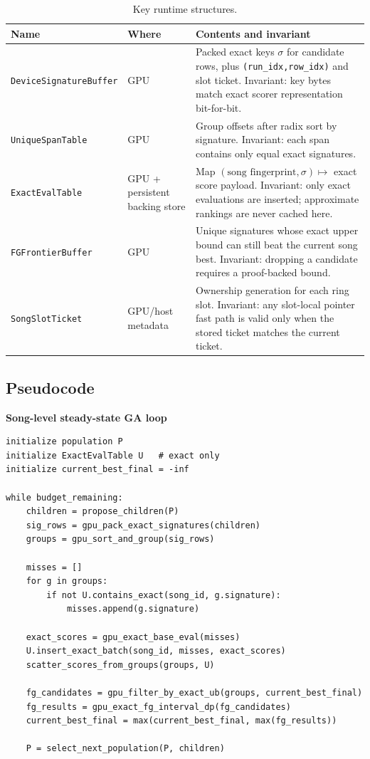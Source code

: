 \documentclass[11pt]{article}
\begin{document}
\begin{table}[H]
\centering
\caption{Key runtime structures.}
\label{tab:datastructures}
\small
\begin{tabularx}{\textwidth}{>{\raggedright\arraybackslash}p{}>{\raggedright\arraybackslash}p{}X}
\toprule
\textbf{Name} & \textbf{Where} & \textbf{Contents and invariant} \\
\midrule
\texttt{DeviceSignatureBuffer} & GPU & Packed exact keys $\sigma$ for candidate rows, plus \texttt{(run\_idx,row\_idx)} and slot ticket. Invariant: key bytes match exact scorer representation bit-for-bit. \\
\midrule
\texttt{UniqueSpanTable} & GPU & Group offsets after radix sort by signature. Invariant: each span contains only equal exact signatures. \\
\midrule
\texttt{ExactEvalTable} & GPU + persistent backing store & Map $(\text{song fingerprint},\sigma) \mapsto$ exact score payload. Invariant: only exact evaluations are inserted; approximate rankings are never cached here. \\
\midrule
\texttt{FGFrontierBuffer} & GPU & Unique signatures whose exact upper bound can still beat the current song best. Invariant: dropping a candidate requires a proof-backed bound. \\
\midrule
\texttt{SongSlotTicket} & GPU/host metadata & Ownership generation for each ring slot. Invariant: any slot-local pointer fast path is valid only when the stored ticket matches the current ticket. \\
\bottomrule
\end{tabularx}
\end{table}

\subsection{Pseudocode}

\textbf{Song-level steady-state GA loop}

\begin{lstlisting}
initialize population P
initialize ExactEvalTable U   # exact only
initialize current_best_final = -inf

while budget_remaining:
    children = propose_children(P)
    sig_rows = gpu_pack_exact_signatures(children)
    groups = gpu_sort_and_group(sig_rows)

    misses = []
    for g in groups:
        if not U.contains_exact(song_id, g.signature):
            misses.append(g.signature)

    exact_scores = gpu_exact_base_eval(misses)
    U.insert_exact_batch(song_id, misses, exact_scores)
    scatter_scores_from_groups(groups, U)

    fg_candidates = gpu_filter_by_exact_ub(groups, current_best_final)
    fg_results = gpu_exact_fg_interval_dp(fg_candidates)
    current_best_final = max(current_best_final, max(fg_results))

    P = select_next_population(P, children)
\end{lstlisting}
\end{document}
